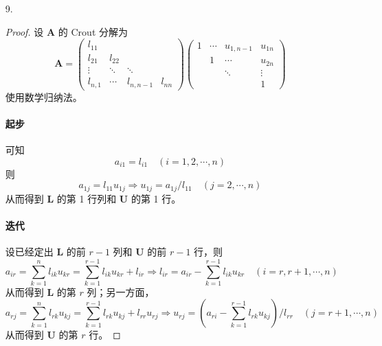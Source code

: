 \documentclass{sjtuarticle}
\begin{document}
\begin{itemize}
    \item[9.] \begin{proof}
        设 $\bm{A}$ 的 Crout 分解为
        \begin{equation*}
            \bm{A}=\begin{pmatrix}
                l_{11} \\
                l_{21} & l_{22} \\
                \vdots & \ddots & \ddots \\
                l_{n,1} & \cdots & l_{n,n-1} & l_{nn}
            \end{pmatrix}
            \begin{pmatrix}
                1 & \cdots & u_{1,n-1} & u_{1n} \\
                  & 1 & \cdots & u_{2n} \\
                  &   &  \ddots & \vdots \\
                  &   &         & 1
            \end{pmatrix}
        \end{equation*}
        使用数学归纳法。
        \paragraph{起步} 可知
        \begin{equation*}
            a_{i1} = l_{i1}\quad (i=1,2,\cdots,n)
        \end{equation*}
        则
        \begin{equation*}
            a_{1j} = l_{11}u_{1j} \Rightarrow u_{1j}= a_{1j} / l_{11} \quad (j=2,\cdots,n)
        \end{equation*}
        从而得到 $\bm{L}$ 的第 1 行列和 $\bm{U}$ 的第 1 行。
        \paragraph{迭代} 设已经定出 $\bm{L}$ 的前 $r-1$ 列和 $\bm{U}$ 的前 $r-1$ 行，则
        \begin{equation*}
            a_{ir} = \sum_{k=1}^n l_{ik}u_{kr} = \sum_{k=1}^{r-1}l_{ik}u_{kr}+l_{ir} \Rightarrow l_{ir}=a_{ir}-\sum_{k=1}^{r-1}l_{ik}u_{kr}\quad (i=r,r+1,\cdots,n)
        \end{equation*}
        从而得到 $\bm{L}$ 的第 $r$ 列；另一方面，
        \begin{equation*}
            a_{rj}= \sum_{k=1}^n l_{rk}u_{kj}=\sum_{k=1}^{r-1} l_{rk}u_{kj}+l_{rr}u_{rj} \Rightarrow u_{rj}=\left(a_{ri}-\sum_{k=1}^{r-1} l_{rk}u_{kj}\right)/l_{rr}\quad (j=r+1,\cdots,n)
        \end{equation*}
        从而得到 $\bm{U}$ 的第 $r$ 行。
        

\end{proof}
\end{itemize}
\end{document}

